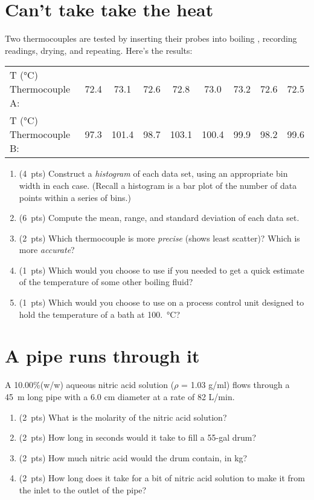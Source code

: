 \documentclass[11pt]{article}
\begin{document}
\section{Can't take take the heat}
\label{sec-2}
Two thermocouples are tested by inserting their probes into boiling , recording readings, drying, and repeating.  Here's the results:

\begin{center}
\begin{tabular}{l|cccccccc}
\hline
T (\si{\celsius}) Thermocouple A: & 72.4 & 73.1 & 72.6 & 72.8 & 73.0 & 73.2 & 72.6 & 72.5\\
T (\si{\celsius}) Thermocouple B: & 97.3 & 101.4 & 98.7 & 103.1 & 100.4 & 99.9 & 98.2 & 99.6\\
\hline
\end{tabular}
\end{center}

\begin{enumerate}
\item (4~pts) Construct a \emph{histogram} of each data set, using an appropriate bin width in each case. (Recall a histogram is a bar plot of the number of data points within a series of bins.)

\item (6~pts) Compute the mean, range, and standard deviation of each data set.

\item (2~pts) Which thermocouple is more \emph{precise} (shows least scatter)?  Which is more \emph{accurate}?

\item (1~pts) Which would you choose to use if you needed to get a quick estimate of the temperature of some other boiling fluid?

\item (1~pts) Which would you choose to use on a process control unit designed to hold the temperature of a bath at \SI{100.}{\celsius}?
\end{enumerate}


\section{A pipe runs through it}
\label{sec-3}
A 10.00\%(w/w) aqueous nitric acid solution ($\rho$ = 1.03 g/ml) flows through a \SI{45}{\meter} long pipe with a 6.0 cm diameter at a rate of 82 L/min.

\begin{enumerate}
\item (2~pts) What is the molarity of the nitric acid solution?

\item (2~pts) How long in seconds would it take to fill a 55-gal drum?

\item (2~pts) How much nitric acid would the drum contain, in kg?

\item (2~pts) How long does it take for a bit of nitric acid solution to make it from the inlet to the outlet of the pipe?
\end{enumerate}
\end{document}

